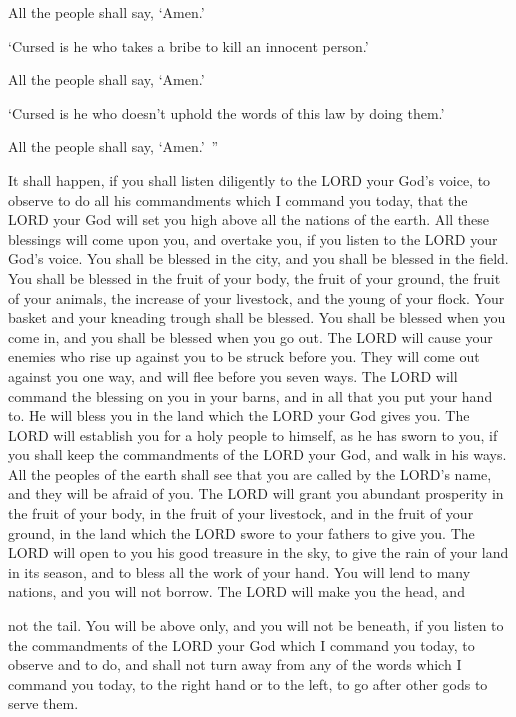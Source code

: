 All the people shall say, ‘Amen.’

\myverse{}‘Cursed is he who takes a bribe to kill an innocent person.’

All the people shall say, ‘Amen.’

\myverse{}‘Cursed is he who doesn’t uphold the words of this law by doing
them.’

All the people shall say, ‘Amen.’ ”



\mychapter{} \myverse*{}It shall happen, if you shall listen diligently to the LORD your
God’s voice, to observe to do all his commandments which I command you today, that the LORD your God will
set you high above all the nations of the earth.
\myverse{}All these blessings will come upon you, and overtake you, if you listen to
the LORD your God’s voice.
\myverse{}You shall be blessed in the city, and you shall be blessed in the field.
\myverse{}You shall be blessed in the fruit of your body, the fruit of your ground, the
fruit of your animals, the increase of your livestock, and the young of your flock.
\myverse{}Your basket and your kneading trough shall be blessed.
\myverse{}You shall be blessed when you come in, and you shall be blessed when you go
out.
\myverse{}The LORD will cause your enemies who rise up against you to be struck before
you. They will come out against you one way, and will flee before you seven ways.
\myverse{}The LORD will command the blessing on you in your barns, and in all that you
put your hand to. He will bless you in the land which the LORD your God gives you.
\myverse{}The LORD will establish you for a holy people to himself, as he has sworn to
you, if you shall keep the commandments of the LORD your God, and walk in his ways.
\myverse{}All the peoples of the earth shall see that you are called by the LORD’s
name, and they will be afraid of you.
\myverse{}The LORD will grant you abundant prosperity in the fruit of your body, in
the fruit of your livestock, and in the fruit of your ground, in the land which the LORD swore to your
fathers to give you.
\myverse{}The LORD will open to you his good treasure in the sky, to give the rain
of your land in its season, and to bless all the work of your hand. You will lend to many nations, and
you will not borrow.
\myverse{}The LORD will make you the head, and



\noindent not the tail. You will be above only,
and you will not be beneath, if you listen to the commandments of the LORD your God which I command you
today, to observe and to do,
\myverse{}and shall not turn away from any of the words which I command you today,
to the right hand or to the left, to go after other gods to serve them.

